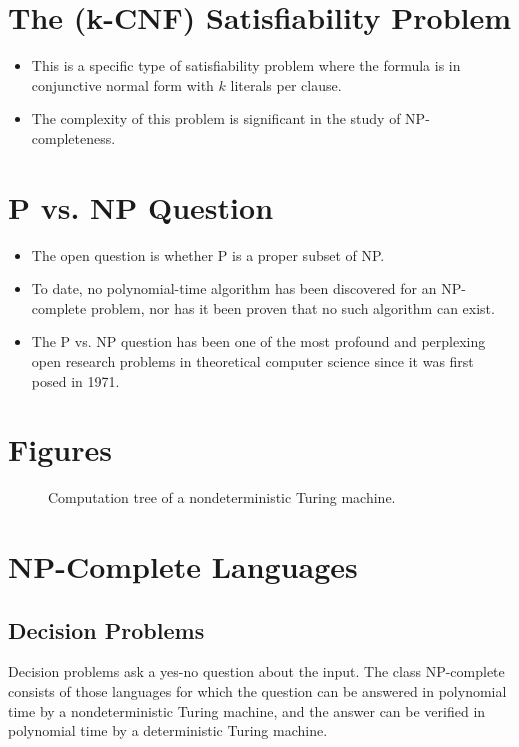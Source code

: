 \documentclass[12pt,openany]{book}
\theoremstyle{definition}
\begin{document}
\section{The (k-CNF) Satisfiability Problem}
\begin{itemize}
	\item This is a specific type of satisfiability problem where the formula is in conjunctive normal form with \( k \) literals per clause.
	\item The complexity of this problem is significant in the study of NP-completeness.
\end{itemize}

\section{P vs. NP Question}
\begin{itemize}
	\item The open question is whether P is a proper subset of NP.
	\item To date, no polynomial-time algorithm has been discovered for an NP-complete problem, nor has it been proven that no such algorithm can exist.
	\item The P vs. NP question has been one of the most profound and perplexing open research problems in theoretical computer science since it was first posed in 1971.
\end{itemize}

\section{Figures}
\begin{figure}[ht]
	\centering
	\caption{Computation tree of a nondeterministic Turing machine.}
\end{figure}

\section{NP-Complete Languages}

\subsection{Decision Problems}
Decision problems ask a yes-no question about the input. The class NP-complete consists of those languages for which the question can be answered in polynomial time by a nondeterministic Turing machine, and the answer can be verified in polynomial time by a deterministic Turing machine.
\end{document}
